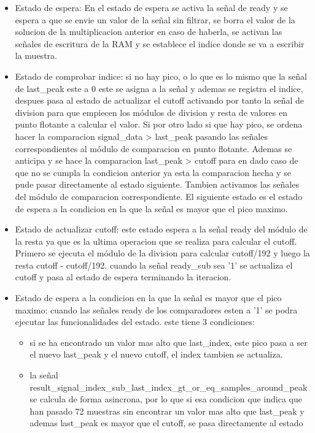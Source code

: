 \begin{itemize}
    \item Estado de espera: En el estado de espera se activa la señal de ready y se espera a que se envie un valor de la
    señal sin filtrar, se borra el valor de la solucion de la multiplicacion anterior en caso de haberla, se activan las
    señales de escritura de la RAM y se establece el indice donde se va a escribir la muestra.
    \item Estado de comprobar indice: si no hay pico, o lo que es lo mismo que la señal de last\_peak este a 0 este se asigna
     a la señal y ademas se registra el indice, despues pasa al estado de actualizar el cutoff activando por tanto la señal de 
     division para que empiecen los módulos de division y resta de valores en punto flotante a calcular el valor. Si por otro
     lado si que hay pico, se ordena hacer la comparacion signal\_data > last\_peak pasando las señales correspondientes al módulo de comparacion en 
     punto flotante. Ademas se anticipa y se hace la comparacion last\_peak > cutoff para en dado caso de que no se cumpla la 
     condicion anterior ya esta la comparacion hecha y se pude pasar directamente al estado siguiente. Tambien activamos las señales
     del módulo de comparacion correspondiente. El siguiente estado es el estado de espera a la condicion en la que la señal es mayor 
     que el pico maximo.
    \item Estado de actualizar cutoff: este estado espera a la señal ready del módulo de la resta ya que es la ultima operacion que se realiza para 
    calcular el cutoff. Primero se ejecuta el módulo de la division para calcular cutoff/192 y luego la resta cutoff - cutoff/192. cuando la señal
    ready\_sub sea '1' se actualiza el cutoff y pasa al estado de espera terminando la iteracion. 
    \item Estado de espera a la condicion en la que la señal es mayor que el pico maximo: cuando las señales ready de los comparadores esten a '1' 
    se podra ejecutar las funcionalidades del estado. este tiene 3 condiciones:
    \begin{itemize}
        \item si se ha encontrado un valor mas alto que last\_index, este pico pasa a ser el nuevo last\_peak y el nuevo cutoff, el index tambien se actualiza. 
        \item la señal result\_signal\_index\_sub\_last\_index\_gt\_or\_eq\_samples\_around\_peak se calcula de forma asincrona, por lo que si esa condicion que
         indica que han pasado 72 muestras sin encontrar un valor mas alto que last\_peak y ademas last\_peak es mayor que el cutoff, se pasa directamente al estado

\end{itemize}
\end{itemize}
